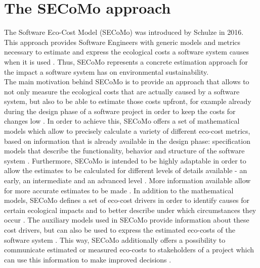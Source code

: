 \documentclass[oribibl]{llncs}
\begin{document}
\section{The SECoMo approach\label{secomo}} %
The Software Eco-Cost Model (SECoMo) was introduced by Schulze \cite{schulze_cost_2016} in 2016. This approach provides Software Engineers with generic models and metrics necessary to estimate and express the ecological costs a software system causes when it is used \cite{schulze_cost_2016}. Thus, SECoMo represents a concrete estimation approach for the impact a software system has on environmental sustainability.\\
The main motivation behind SECoMo is to provide an approach that allows to not only measure the ecological costs that are actually caused by a software system, but also to be able to estimate those costs upfront, for example already during the design phase of a software project in order to keep the costs for changes low \cite{schulze_cost_2016}. %
In order to achieve this, SECoMo offers a set of mathematical models which allow to precisely calculate a variety of different eco-cost metrics, based on information that is already available in the design phase: specification models %
that describe the functionality, behavior and structure of the software system \cite{schulze_cost_2016}. Furthermore, SECoMo is intended to be highly adaptable in order to allow the estimates to be calculated for different levels of details available - an early, an intermediate and an advanced level \cite{schulze_cost_2016}. More information available allow for more accurate estimates to be made \cite{schulze_cost_2016}. %
In addition to the mathematical models, SECoMo defines a set of eco-cost drivers in order to identify causes for certain ecological impacts and to better describe under which circumstances they occur \cite{schulze_cost_2016}. The auxiliary models used in SECoMo provide information about these cost drivers, but can also be used to express the estimated eco-costs of the software system \cite{schulze_cost_2016}. This way, SECoMo additionally offers a possibility to communicate estimated or measured eco-costs to stakeholders of a project which can use this information to make improved decisions \cite{schulze_cost_2016}.\\ %
\end{document}

